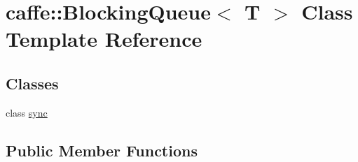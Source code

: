 \hypertarget{classcaffe_1_1_blocking_queue}{}\section{caffe\+:\+:Blocking\+Queue$<$ T $>$ Class Template Reference}
\label{classcaffe_1_1_blocking_queue}
\subsection*{Classes}
\begin{DoxyCompactItemize}
\item 
class \mbox{\hyperlink{classcaffe_1_1_blocking_queue_1_1sync}{sync}}
\end{DoxyCompactItemize}
\subsection*{Public Member Functions}
